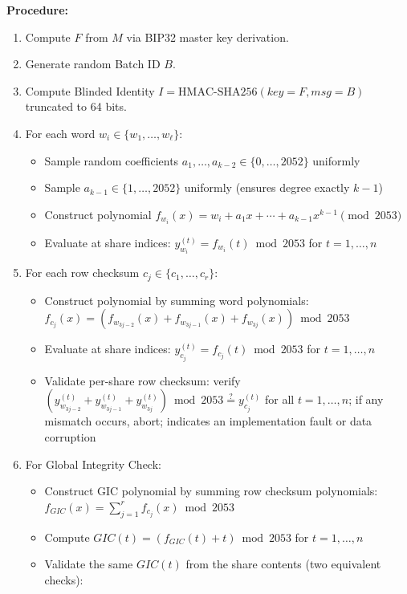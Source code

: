 \documentclass[11pt]{article}
\begin{document}
\textbf{Procedure:}
\begin{enumerate}[noitemsep]
    \item Compute $F$ from $M$ via BIP32 master key derivation.
    \item Generate random Batch ID $B$.
    \item Compute Blinded Identity $I = \text{HMAC-SHA256}(key=F, msg=B)$ truncated to 64 bits.
    \item For each word $w_i \in \{w_1, \ldots, w_\ell\}$:
    \begin{itemize}[noitemsep]
        \item Sample random coefficients $a_1, \ldots, a_{k-2} \in \{0, \ldots, 2052\}$ uniformly
        \item Sample $a_{k-1} \in \{1, \ldots, 2052\}$ uniformly (ensures degree exactly $k-1$)
        \item Construct polynomial $f_{w_i}(x) = w_i + a_1 x + \cdots + a_{k-1} x^{k-1} \pmod{2053}$
        \item Evaluate at share indices: $y_{w_i}^{(t)} = f_{w_i}(t) \bmod 2053$ for $t = 1, \ldots, n$
    \end{itemize}
    \item For each row checksum $c_j \in \{c_1, \ldots, c_r\}$:
    \begin{itemize}[noitemsep]
        \item Construct polynomial by summing word polynomials: $f_{c_j}(x) = (f_{w_{3j-2}}(x) + f_{w_{3j-1}}(x) + f_{w_{3j}}(x)) \bmod 2053$
        \item Evaluate at share indices: $y_{c_j}^{(t)} = f_{c_j}(t) \bmod 2053$ for $t = 1, \ldots, n$
        \item Validate per-share row checksum: verify $(y_{w_{3j-2}}^{(t)} + y_{w_{3j-1}}^{(t)} + y_{w_{3j}}^{(t)}) \bmod 2053 \stackrel{?}{=} y_{c_j}^{(t)}$ for all $t = 1, \ldots, n$; if any mismatch occurs, abort; indicates an implementation fault or data corruption
    \end{itemize}
    \item For Global Integrity Check:
    \begin{itemize}[noitemsep]
        \item Construct GIC polynomial by summing row checksum polynomials: $f_{GIC}(x) = \sum_{j=1}^{r} f_{c_j}(x) \bmod 2053$
        \item Compute $GIC(t) = (f_{GIC}(t) + t) \bmod 2053$ for $t = 1, \ldots, n$
        \item Validate the same $GIC(t)$ from the share contents (two equivalent checks):

\end{itemize}
\end{enumerate}
\end{document}

